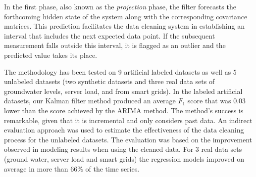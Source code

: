In the first phase, also known as the \textit{projection} phase, the filter forecasts the forthcoming hidden state of the system along with the corresponding covariance matrices. 
This prediction facilitates the data cleaning system in establishing an interval that includes the next expected data point.
If the subsequent measurement falls outside this interval, it is flagged as an outlier and the predicted value takes its place.

The methodology has been tested on 9 artificial labeled datasets as well as 5 unlabeled datasets (two synthetic datasets and three real data sets of groundwater levels, server load, and from smart grids).
In the labeled artificial datasets, our Kalman filter method produced an average $F_1$ score that was $0.03$ lower than the score achieved by the ARIMA method.
The method's success is remarkable, given that it is incremental and only considers past data.
An indirect evaluation approach was used to estimate the effectiveness of the data cleaning process for the unlabeled datasets.
The evaluation was based on the improvement observed in modeling results when using the cleaned data.
For 3 real data sets (ground water, server load and smart grids) the regression models improved on average in more than $66\%$ of the time series.

